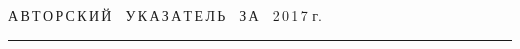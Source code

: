 




\def\stat{cont}


{%




\raggedleft\Large \bf%


А\,В\,Т\,О\,Р\,С\,К\,И\,Й\ \ У\,К\,А\,З\,А\,Т\,Е\,Л\,Ь\ \ З\,А\ \ 2\,0\,1\,7 г. \vskip 17pt


 \hrule


 \par


 }







\label{st\stat}

















\def\leftkol{\ } %


\def\rightkol{\ } %






















\def\leftfootline{\small{\textbf{\thepage}


\hfill СИСТЕМЫ И СРЕДСТВА ИНФОРМАТИКИ\ \ \ выпуск~27\ \ \ №~4\ \ \ 2017}


}%


 \def\rightfootline{\small{СИСТЕМЫ И СРЕДСТВА ИНФОРМАТИКИ\ \ \ выпуск~27\ \ \


№~4\ \ \ 2017


 \hfill \textbf{\thepage}}}





